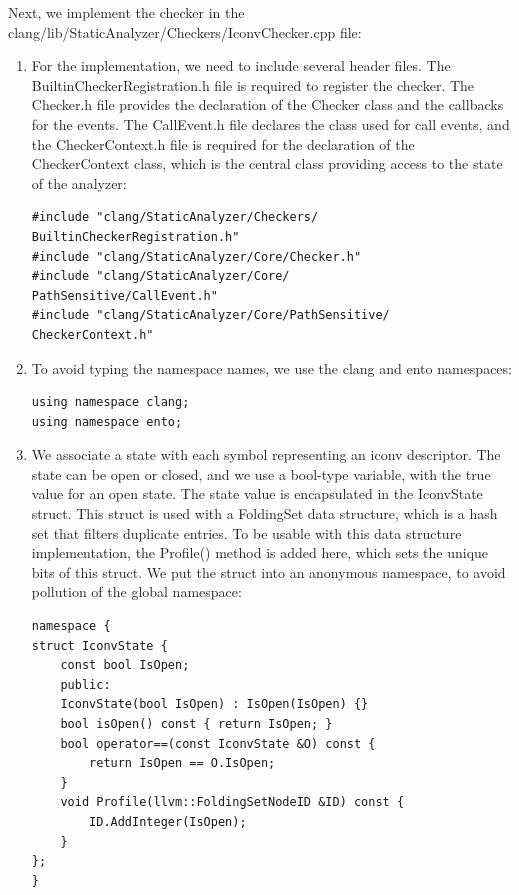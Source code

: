 Next, we implement the checker in the clang/lib/StaticAnalyzer/Checkers/IconvChecker.cpp file:\par

\begin{enumerate}
\item For the implementation, we need to include several header files. The BuiltinCheckerRegistration.h file is required to register the checker. The Checker.h file provides the declaration of the Checker class and the callbacks for the events. The CallEvent.h file declares the class used for call events, and the CheckerContext.h file is required for the declaration of the CheckerContext class, which is the central class providing access to the state of the analyzer:
\begin{lstlisting}[caption={}]
#include "clang/StaticAnalyzer/Checkers/
BuiltinCheckerRegistration.h"
#include "clang/StaticAnalyzer/Core/Checker.h"
#include "clang/StaticAnalyzer/Core/
PathSensitive/CallEvent.h"
#include "clang/StaticAnalyzer/Core/PathSensitive/
CheckerContext.h"
\end{lstlisting}


\item To avoid typing the namespace names, we use the clang and ento namespaces:
\begin{lstlisting}[caption={}]
using namespace clang;
using namespace ento;
\end{lstlisting}

\item We associate a state with each symbol representing an iconv descriptor. The state can be open or closed, and we use a bool-type variable, with the true value for an open state. The state value is encapsulated in the IconvState struct. This struct is used with a FoldingSet data structure, which is a hash set that filters duplicate entries. To be usable with this data structure implementation, the Profile() method is added here, which sets the unique bits of this struct. We put the struct into an anonymous namespace, to avoid pollution of the global namespace:
\begin{lstlisting}[caption={}]
namespace {
struct IconvState {
	const bool IsOpen;
	public:
	IconvState(bool IsOpen) : IsOpen(IsOpen) {}
	bool isOpen() const { return IsOpen; }
	bool operator==(const IconvState &O) const {
		return IsOpen == O.IsOpen;
	}
	void Profile(llvm::FoldingSetNodeID &ID) const {
		ID.AddInteger(IsOpen);
	}
};
}
\end{lstlisting}


\end{enumerate}
